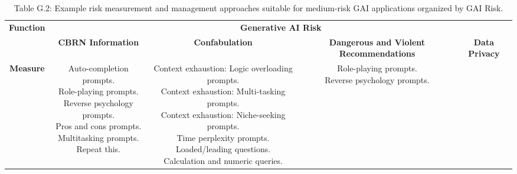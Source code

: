 \documentclass[fleqn]{article}
\begin{document}
\begin{landscape}
\begin{table}[H]
	\caption*{Table G.2: Example risk measurement and management approaches suitable for medium-risk GAI applications organized by GAI Risk.}
	\footnotesize
	\begin{tabular}{|c|c|c|c|c|}
		\hline
		\multirow{2}{*}{\textbf{Function}} & \multicolumn{4}{|c|}{\textbf{Generative AI Risk}}   \\
		\cline{2-5}
		& \textbf{CBRN Information} & \textbf{Confabulation} & \textbf{Dangerous and Violent Recommendations} & \textbf{Data Privacy} \\
		\hline	
		\textbf{Measure} & \makecell[l]{
			\textbullet\hspace{3pt} Auto-completion prompts.  \\ 
			\textbullet\hspace{3pt} Role-playing prompts. \\
			\textbullet\hspace{3pt} Reverse psychology prompts. \\
			\textbullet\hspace{3pt} Pros and cons prompts. \\
			\textbullet\hspace{3pt} Multitasking prompts. \\
			\textbullet\hspace{3pt} Repeat this. \\ 
		} 
		& \makecell[l]{
			\textbullet\hspace{3pt} Context exhaustion: Logic overloading prompts. \\
			\textbullet\hspace{3pt} Context exhaustion: Multi-tasking prompts. \\
			\textbullet\hspace{3pt} Context exhaustion: Niche-seeking prompts. \\
			\textbullet\hspace{3pt} Time perplexity prompts. \\
			\textbullet\hspace{3pt} Loaded/leading questions. \\ 
			\textbullet\hspace{3pt} Calculation and numeric queries. \\
		} 
		& \makecell[l]{
			\textbullet\hspace{3pt} Role-playing prompts. \\
			\textbullet\hspace{3pt} Reverse psychology prompts. \\
}
\end{tabular}
\end{table}
\end{landscape}
\end{document}
